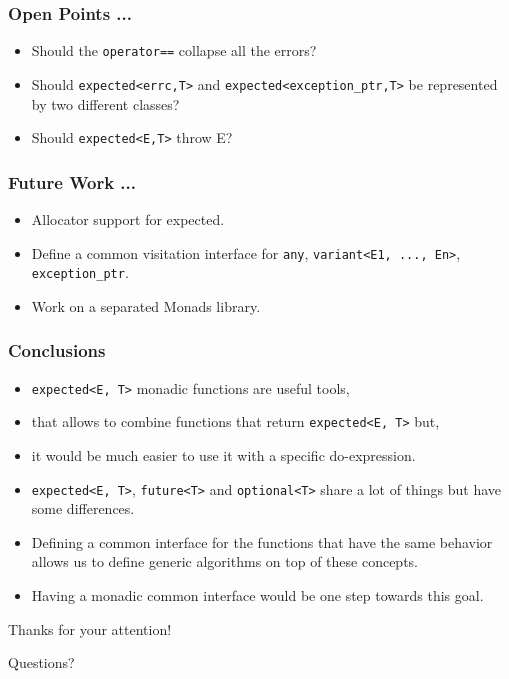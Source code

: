 \documentclass[xcolor=dvipsnames]{beamer}
\newcommand{\cpp}[1]{\lstinline{#1}}
\begin{document}
\begin{frame}
\frametitle{Open Points ...}

\begin{itemize}
  \item Should the \cpp{operator==} collapse all the errors?
  \item Should \cpp{expected<errc,T>} and \cpp{expected<exception_ptr,T>} be represented by two different classes?
  \item Should \cpp{expected<E,T>} throw E?
\end{itemize}

\end{frame}

\begin{frame}
\frametitle{Future Work ...}

\begin{itemize}
  \item Allocator support for expected.
  \item Define a common visitation interface for \cpp{any}, \cpp{variant<E1, ..., En>}, \cpp{exception_ptr}.
  \item Work on a separated Monads library.
\end{itemize}

\end{frame}

\begin{frame}
\frametitle{Conclusions}
\begin{itemize}
  \item \cpp{expected<E, T>} monadic functions are useful tools, 
  \item that allows to combine functions that return \cpp{expected<E, T>} but,
  \item it would be much easier to use it with a specific do-expression.
\end{itemize}

\begin{itemize}
  \item \cpp{expected<E, T>}, \cpp{future<T>} and \cpp{optional<T>} share a lot of things but have some differences.
  \item Defining a common interface for the functions that have the same behavior allows us to define generic algorithms on top of these concepts.
  \item Having a monadic common interface would be one step towards this goal.
\end{itemize}

\end{frame}

\begin{frame}
\begin{center}
\Large{Thanks for your attention!}
\end{center}
\begin{center}
\Large{Questions?}
\end{center}
\end{frame}
\end{document}
